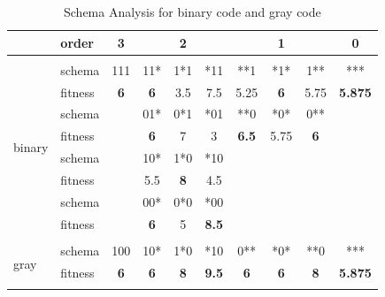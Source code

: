 \documentclass[12pt, a4paper]{article}
\begin{document}
        \begin{table}[H]
        \centering
        \caption{Schema Analysis for binary code and gray code}
        \label{tab:sa}
            \begin{tabular}{|l|l|c|ccc|ccc|c|}
            \hline
                                    & order   & 3          & \multicolumn{3}{c|}{2}                 & \multicolumn{3}{c|}{1}                 & 0              \\ \hline
            \multicolumn{10}{|c|}{} \\ \hline
            \multirow{8}{*}{binary} & schema  & 111        & 11*        & 1*1        & *11          & **1          & *1*        & 1**        & ***            \\
                                    & fitness & \textbf{6} & \textbf{6} & 3.5        & 7.5          & 5.25         & \textbf{6} & 5.75       & \textbf{5.875} \\ \cline{2-10}
                                    & schema  &            & 01*        & 0*1        & *01          & **0          & *0*        & 0**        &                \\
                                    & fitness &            & \textbf{6} & 7          & 3            & \textbf{6.5} & 5.75       & \textbf{6} &                \\ \cline{2-10}
                                    & schema  &            & 10*        & 1*0        & *10          &              &            &            &                \\
                                    & fitness &            & 5.5        & \textbf{8} & 4.5          &              &            &            &                \\ \cline{2-10}
                                    & schema  &            & 00*        & 0*0        & *00          &              &            &            &                \\
                                    & fitness &            & \textbf{6} & 5          & \textbf{8.5} &              &            &            &                \\ \hline
            \multicolumn{10}{|c|}{} \\ \hline
            \multirow{8}{*}{gray}   & schema  & 100        & 10*        & 1*0        & *10          & 0**          & *0*        & **0        & ***            \\
                                    & fitness & \textbf{6} & \textbf{6} & \textbf{8} & \textbf{9.5} & \textbf{6}          & \textbf{6} & \textbf{8} & \textbf{5.875} \\ \cline{2-10}

\end{tabular}
\end{table}
\end{document}
